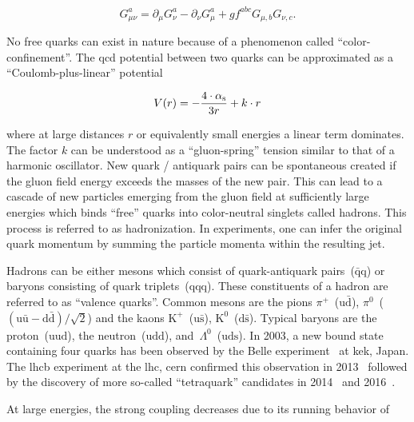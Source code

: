 \begin{equation}
G_{\mu\nu}^{a}=\partial_{\mu} G_\nu^{a}-\partial_{\nu} G_{\mu}^{a}+gf^{abc}G_{\mu,b}G_{\nu,c}.
\end{equation}

No free quarks can exist in nature because of a phenomenon called ``color-confinement''. The \gls{qcd} potential between two quarks can be approximated as a ``Coulomb-plus-linear'' potential~\cite{Sumino2003173}

\begin{equation}
V(r)=-\frac{4\cdot{\alpha_\mathrm{s}}}{3r}+k\cdot r
\end{equation}

where at large distances $r$ or equivalently small energies a linear term dominates. The factor $k$ can be understood as a ``gluon-spring'' tension similar to that of a harmonic oscillator. New quark / antiquark pairs can be spontaneous created if the gluon field energy exceeds the masses of the new pair. This can lead to a cascade of new particles emerging from the gluon field at sufficiently large energies which binds ``free'' quarks into color-neutral singlets called hadrons. This process is referred to as hadronization. In experiments, one can infer the original quark momentum by summing the particle momenta within the resulting jet.

Hadrons can be either mesons which consist of quark-antiquark pairs~($\bar{\mathrm{q}}\mathrm{q}$) or baryons consisting of quark triplets~($\mathrm{qqq}$). These constituents of a hadron are referred to as ``valence quarks''. Common mesons are the pions $\pi^{+}$~($\mathrm{u}\bar{\mathrm{d}}$), $\pi^{0}$~($(\mathrm{u}\bar{\mathrm{u}}-\mathrm{d}\bar{\mathrm{d}})/\sqrt{2}$) and the kaons $\mathrm{K}^{+}$~($\mathrm{u}\bar{\mathrm{s}}$), $\mathrm{K}^{0}$~($\mathrm{d}\bar{\mathrm{s}}$). Typical baryons are the proton~($\mathrm{uud}$), the neutron~($\mathrm{udd}$), and~$\Lambda^{0}$~($\mathrm{uds}$). In 2003, a new bound state containing four quarks has been observed by the Belle experiment~\cite{PhysRevLett.91.262001} at \gls{kek}, Japan. The \gls{lhcb} experiment at the \gls{lhc}, \gls{cern} confirmed this observation in 2013~\cite{Aaij:2013zoa} followed by the discovery of more so-called ``tetraquark'' candidates in 2014~\cite{Aaij:2014jqa} and 2016~\cite{Aaij:2016iza}.


At large energies, the strong coupling decreases due to its running behavior of

